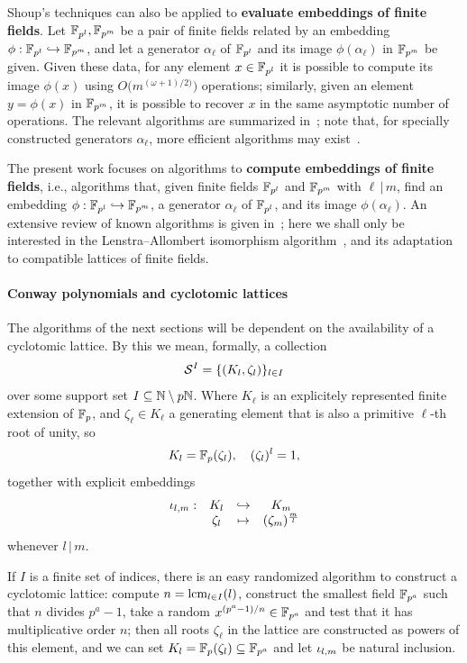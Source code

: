 \documentclass[sigconf]{acmart}
\begin{document}
Shoup's techniques can also be applied to \textbf{evaluate embeddings
  of finite fields}. %
Let $\mathbb{F}_{p^l},\mathbb{F}_{p^m}$ be a pair of finite fields related by an
embedding $\phi:\mathbb{F}_{p^l}\hookrightarrow\mathbb{F}_{p^m}$, and let a
generator $\alpha_\ell$ of $\mathbb{F}_{p^l}$ and its image
$\phi(\alpha_\ell)$ in $\mathbb{F}_{p^m}$ be given. %
Given these data, for any element $x\in\mathbb{F}_{p^l}$ it is possible to
compute its image $\phi(x)$ using $O\bigl(m^{(\omega+1)/2)}\bigr)$
operations; similarly, given an element $y=\phi(x)$ in $\mathbb{F}_{p^m}$, it
is possible to recover $x$ in the same asymptotic number of
operations. %
The relevant algorithms are summarized in~\cite[Sec.~6]{ffisom-long};
note that, for specially constructed generators $\alpha_\ell$, more
efficient algorithms may
exist~\cite{df+schost12,DoSc12,DeDoSc13,DeDoSc2014}.

The present work focuses on algorithms to \textbf{compute embeddings
  of finite fields}, i.e., algorithms that, given finite fields
$\mathbb{F}_{p^l}$ and $\mathbb{F}_{p^m}$ with $\ell\,|\,m$, find an embedding
$\phi:\mathbb{F}_{p^l}\hookrightarrow\mathbb{F}_{p^m}$, a generator $\alpha_\ell$
of $\mathbb{F}_{p^l}$, and its image $\phi(\alpha_\ell)$. %
An extensive review of known algorithms is given
in~\cite{brieulle2018computing}; here we shall only be interested in
the Lenstra--Allombert isomorphism
algorithm~\cite{LenstraJr91,Allombert02}, and its adaptation to
compatible lattices of finite fields.


\paragraph{Conway polynomials and cyclotomic lattices}
The algorithms of the next sections will be dependent on the
availability of a cyclotomic lattice. %
By this we mean, formally, a collection
\[ \mathcal{S}^{I}=\{(K_l,\zeta_l)\}_{l\in I} \]
over some support set $I\subseteq\mathbb{N}\setminus p\mathbb{N}$.
Where $K_\ell$ is an explicitely represented finite extension of $\mathbb{F}_p$,
and $\zeta_\ell\in K_\ell$ a generating element that is also a primitive $\ell$-th root
of unity,
so \[ K_l=\mathbb{F}_p(\zeta_l),\quad(\zeta_l)^l=1, \]
together with
explicit embeddings
\[
\begin{array}{cccc}
  {\iota_{{l},{m}}}: & K_l & \hookrightarrow & K_m \\
  & \zeta_l & \mapsto & (\zeta_{m})^{\frac{m}{l}}
\end{array}
\]
whenever $l\,|\,m$.

If $I$ is a finite set of indices, there is an easy randomized
algorithm to construct a cyclotomic lattice: compute
$n=\operatorname{lcm}_{l\in I}(l)$, construct the smallest field $\mathbb{F}_{p^a}$ such
that $n$ divides $p^a-1$, take a random $x^{(p^a-1)/n}\in\mathbb{F}_{p^a}$ and
test that it has multiplicative order $n$;
then all roots $\zeta_\ell$ in the
lattice are constructed as powers of this element,
and we can set $K_l=\mathbb{F}_p(\zeta_l)\subseteq\mathbb{F}_{p^a}$
and let ${\iota_{{l},{m}}}$ be natural inclusion.
\end{document}
